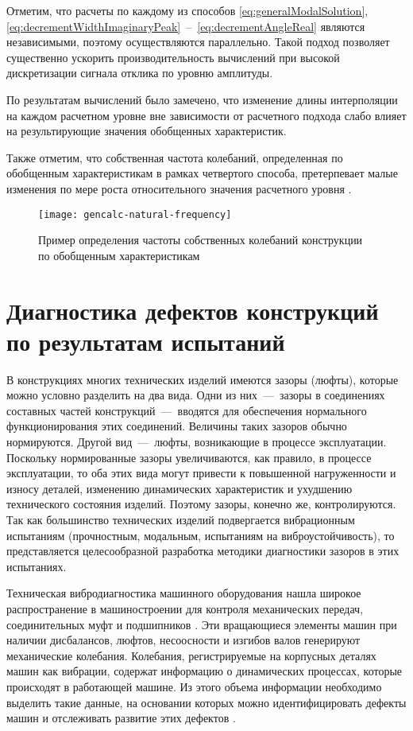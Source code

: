 Отметим, что расчеты по каждому из способов \eqref{eq:generalModalSolution}, \eqref{eq:decrementWidthImaginaryPeak}~--~\eqref{eq:decrementAngleReal} являются независимыми, поэтому осуществляются параллельно. Такой подход позволяет существенно ускорить производительность вычислений при высокой дискретизации сигнала отклика по уровню амплитуды.

По результатам вычислений было замечено, что изменение длины интерполяции на каждом расчетном уровне вне зависимости от расчетного подхода слабо влияет на результирующие значения обобщенных характеристик.

Также отметим, что собственная частота колебаний, определенная по обобщенным характеристикам в рамках четвертого способа, претерпевает малые изменения по мере роста относительного значения расчетного уровня .

\begin{figure}[!htb]
	\centering
	\texttt{[image: gencalc-natural-frequency]}
	\caption{Пример определения частоты собственных колебаний конструкции по обобщенным характеристикам} \label{fig:gencalc-natural-frequency}
\end{figure}

\section{Диагностика дефектов конструкций по результатам испытаний}

В конструкциях многих технических изделий имеются зазоры (люфты), которые можно условно разделить на два вида. Одни из них~---~зазоры в соединениях составных частей конструкций~---~вводятся для обеспечения нормального функционирования этих соединений. Величины таких зазоров обычно нормируются. Другой вид~---~люфты, возникающие в процессе эксплуатации. Поскольку нормированные зазоры увеличиваются, как правило, в процессе эксплуатации, то оба этих вида могут привести к повышенной нагруженности и износу деталей, изменению динамических характеристик и ухудшению технического состояния изделий. Поэтому зазоры, конечно же, контролируются. Так как большинство технических изделий подвергается вибрационным испытаниям (прочностным, модальным, испытаниям на виброустойчивость), то представляется целесообразной разработка методики диагностики зазоров в этих испытаниях. 

Техническая вибродиагностика машинного оборудования нашла широкое распространение в машиностроении для контроля механических передач, соединительных муфт и подшипников \cite{lib:defects:Tiwari, lib:defects:Bachschmid, lib:defects:Kostjukov, lib:defects:Balickij, lib:defects:Zhukov}. Эти вращающиеся элементы машин при наличии дисбалансов, люфтов, несоосности и изгибов валов генерируют механические колебания. Колебания, регистрируемые на корпусных деталях машин как вибрации, содержат информацию о динамических процессах, которые происходят в работающей машине. Из этого объема информации необходимо выделить такие данные, на основании которых можно идентифицировать дефекты машин и отслеживать развитие этих дефектов \cite{lib:defects:Zhuge, lib:defects:Lacey, lib:defects:Litak}.

